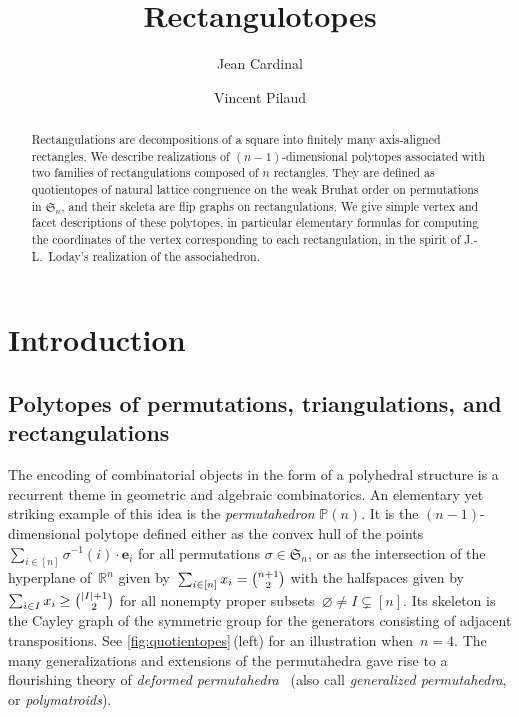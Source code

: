 \documentclass{amsart}
\title{Rectangulotopes}
\author{Jean Cardinal}
\author{Vincent Pilaud}
\theoremstyle{definition}
\newcommand{\R}{\mathbb{R}} %
\renewcommand{\b}[1]{{\boldsymbol{#1}}} %
\newcommand{\f}[1]{\mathfrak{#1}} %
\newcommand{\darkblue}{\color{darkblue}} %
\newcommand{\defn}[1]{\textsl{\darkblue #1}} %
\newcommand{\polytope}[1]{\mathds{#1}} %
\newcommand{\Perm}{\polytope{P}} %
\begin{document}
\begin{abstract}
  Rectangulations are decompositions of a square into finitely many axis-aligned rectangles.
  We describe realizations of $(n-1)$-dimensional polytopes associated with two families of rectangulations composed of $n$ rectangles.
  They are defined as quotientopes of natural lattice congruence on the weak Bruhat order on permutations in $\f{S}_n$, and their skeleta are flip graphs on rectangulations.
  We give simple vertex and facet descriptions of these polytopes, in particular elementary formulas for computing the coordinates of the vertex corresponding to each rectangulation, in the spirit of J.-L.~Loday's realization of the associahedron.
\end{abstract}

\maketitle

\tableofcontents


\section{Introduction}
\label{sec:intro}


\subsection{Polytopes of permutations, triangulations, and rectangulations}
\label{subsec:permTrianRect}

The encoding of combinatorial objects in the form of a polyhedral structure is a recurrent theme in geometric and algebraic combinatorics.
An elementary yet striking example of this idea is the \defn{permutahedron} $\Perm (n)$.
It is the $(n-1)$-dimensional polytope defined either as the convex hull of the points $\sum_{i\in [n]} \sigma^{-1}(i)\cdot \b{e}_i$ for all permutations $\sigma \in \f{S}_n$, or as the intersection of the hyperplane of~$\R^n$ given by~$\sum_{i \in [n]} x_i = \smash{\binom{n+1}{2}}$ with the halfspaces given by~$\sum_{i \in I} x_i \ge \smash{\binom{|I|+1}{2}}$ for all nonempty proper subsets~$\varnothing \ne I \subsetneq [n]$.
Its skeleton is the Cayley graph of the symmetric group for the generators consisting of adjacent transpositions.
See \cref{fig:quotientopes}\,(left) for an illustration when~$n = 4$.
The many generalizations and extensions of the permutahedra gave rise to a flourishing theory of \defn{deformed permutahedra}~\cite{MR2520477,Postnikov,MR4064768,MR4651496} (also call \defn{generalized permutahedra}, or \defn{polymatroids}).
\end{document}
